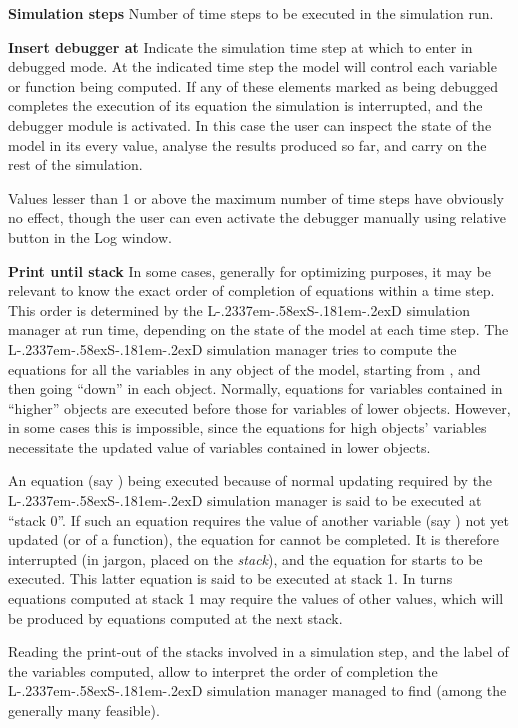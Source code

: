 \documentclass [11pt,a4paper] {book}
\def\LsD{{L\kern-.2337em\lower-.58ex\hbox{S}\kern-.181em\lower-.2ex\hbox{D}}\xspace}
\begin{document}
\textbf{Simulation steps} 
Number of time steps to be executed in the simulation run.

\textbf{Insert debugger at} 
Indicate the simulation time step at which to enter in debugged mode. At the indicated time step the model will control each variable or function being computed. If any of these elements marked as being debugged completes the execution of its equation the simulation is interrupted, and the debugger module is activated. In this case the user can inspect the state of the model in its every value, analyse the results produced so far, and carry on the rest of the simulation.

Values lesser than 1 or above the maximum number of time steps have obviously no effect, though the user can even activate the debugger manually using relative button in the Log window.

\textbf{Print until stack} 
In some cases, generally for optimizing purposes, it may be relevant to know the exact order of completion of equations within a time step. This order is determined by the \LsD simulation manager at run time, depending on the state of the model at each time step. The \LsD simulation manager tries to compute the equations for all the variables in any object of the model, starting from , and then going ``down'' in each object. Normally, equations for variables contained in ``higher'' objects are executed before those for variables of lower objects. However, in some cases this is impossible, since the equations for high objects' variables necessitate the updated value of variables contained in lower objects. 

An equation (say ) being executed because of normal updating required by the \LsD simulation manager is said to be executed at ``stack 0''. If such an equation requires the value of another variable (say ) not yet updated (or of a function), the equation for  cannot be completed. It is therefore interrupted (in jargon, placed on the \textit{stack}), and the equation for  starts to be executed. This latter equation is said to be executed at stack 1. In turns equations computed at stack 1 may require the values of other values, which will be produced by equations computed at the next stack.

Reading the print-out of the stacks involved in a simulation step, and the label of the variables computed, allow to interpret the order of completion the \LsD simulation manager managed to find (among the generally many feasible). 
\end{document}
